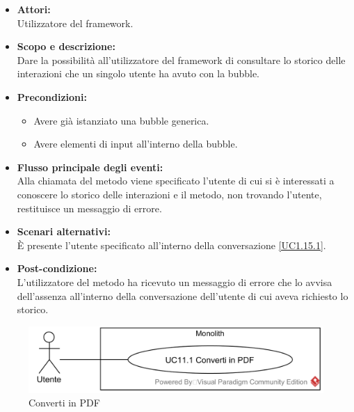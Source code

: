 \begin{itemize}
	\item \textbf{Attori:}
	\\Utilizzatore del framework.
	\item \textbf{Scopo e descrizione:} 
	\\Dare la possibilità all'utilizzatore del framework di consultare lo storico delle interazioni che un singolo utente ha avuto con la bubble.
	\item \textbf{Precondizioni:}
	\begin{itemize}
		\item Avere già istanziato una bubble generica.
		\item Avere elementi di input all'interno della bubble.
	\end{itemize}
	\item \textbf{Flusso principale degli eventi:}
	\\Alla chiamata del metodo viene specificato l'utente di cui si è interessati a conoscere lo storico delle interazioni e il metodo, non trovando l'utente, restituisce un messaggio di errore.
	\item \textbf{Scenari alternativi:}
	\\È presente l'utente specificato all'interno della conversazione \ref{UC1.15.1}.
	\item \textbf{Post-condizione:}
	\\L'utilizzatore del metodo ha ricevuto un messaggio di errore che lo avvisa dell'assenza all'interno della conversazione dell'utente di cui aveva richiesto lo storico.
\end{itemize}

\begin{samepage}
\isfirsttrue
{}
\nopagebreak
\begin{figure}[H]
	\centering
	\includegraphics[width=15cm]{../../documenti/AnalisiDeiRequisiti/Diagrammi_img/usecase/uc1_20.png}
	\caption{\UCCCaption{} Converti in PDF}
\end{figure}
\end{samepage}

